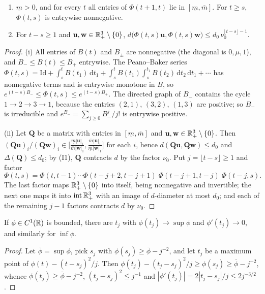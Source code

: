 \begin{lemma}\label{att:lem:cone}
\begin{enumerate}[label=\textup{(\roman*)}]
\item $\underline m>0$, and for every $t$ all entries of $\Phi(t+1,t)$ lie in $[\underline m,\overline m]$. For $t\ge s$, $\Phi(t,s)$ is entrywise nonnegative.
\item For $t-s\ge1$ and $\mathbf u,\mathbf w\in\mathbb R^3_+\setminus\{0\}$,
$d\bigl(\Phi(t,s)\mathbf u,\Phi(t,s)\mathbf w\bigr)\le d_0\,\nu_0^{\lfloor t-s\rfloor-1}$.
\end{enumerate}
\end{lemma}
\begin{proof}
(i) All entries of $B(t)$ and $B_\pm$ are nonnegative (the diagonal is $0,\mu,1$), and $B_-\le B(t)\le B_+$ entrywise. The Peano--Baker series $\Phi(t,s)=\mathrm{Id}+\int_s^tB(t_1)\,\mathrm dt_1+\int_s^tB(t_1)\int_s^{t_1}B(t_2)\,\mathrm dt_2\,\mathrm dt_1+\cdots$ has nonnegative terms and is entrywise monotone in $B$, so $e^{(t-s)B_-}\le\Phi(t,s)\le e^{(t-s)B_+}$. The directed graph of $B_-$ contains the cycle $1\to2\to3\to1$, because the entries $(2,1)$, $(3,2)$, $(1,3)$ are positive; so $B_-$ is irreducible and $e^{B_-}=\sum_{j\ge0}B_-^j/j!$ is entrywise positive.

(ii) Let $\mathbf Q$ be a matrix with entries in $[\underline m,\overline m]$ and $\mathbf u,\mathbf w\in\mathbb R^3_+\setminus\{0\}$. Then
$(\mathbf Q\mathbf u)_i/(\mathbf Q\mathbf w)_i\in\bigl[\tfrac{\underline m|\mathbf u|_1}{\overline m|\mathbf w|_1},\tfrac{\overline m|\mathbf u|_1}{\underline m|\mathbf w|_1}\bigr]$ for each $i$, hence $d(\mathbf Q\mathbf u,\mathbf Q\mathbf w)\le d_0$ and $\Delta(\mathbf Q)\le d_0$; by (I1), $\mathbf Q$ contracts $d$ by the factor $\nu_0$. Put $j=\lfloor t-s\rfloor\ge1$ and factor
\[
\Phi(t,s)=\Phi(t,t-1)\cdots\Phi(t-j+2,t-j+1)\;\Phi(t-j+1,t-j)\;\Phi(t-j,s).
\]
The last factor maps $\mathbb R^3_+\setminus\{0\}$ into itself, being nonnegative and invertible; the next one maps it into $\operatorname{int}\mathbb R^3_+$ with an image of $d$-diameter at most $d_0$; and each of the remaining $j-1$ factors contracts $d$ by $\nu_0$.
\end{proof}

\begin{lemma}\label{att:lem:sup}
If $\phi\in C^1(\mathbb R)$ is bounded, there are $t_j$ with $\phi(t_j)\to\sup\phi$ and $\phi'(t_j)\to0$, and similarly for $\inf\phi$.
\end{lemma}
\begin{proof}
Let $\overline\phi=\sup\phi$, pick $s_j$ with $\phi(s_j)\ge\overline\phi-j^{-2}$, and let $t_j$ be a maximum point of $\phi(t)-(t-s_j)^2/j$. Then $\phi(t_j)-(t_j-s_j)^2/j\ge\phi(s_j)\ge\overline\phi-j^{-2}$, whence $\phi(t_j)\ge\overline\phi-j^{-2}$, $(t_j-s_j)^2\le j^{-1}$ and $|\phi'(t_j)|=2|t_j-s_j|/j\le2j^{-3/2}$.
\end{proof}

